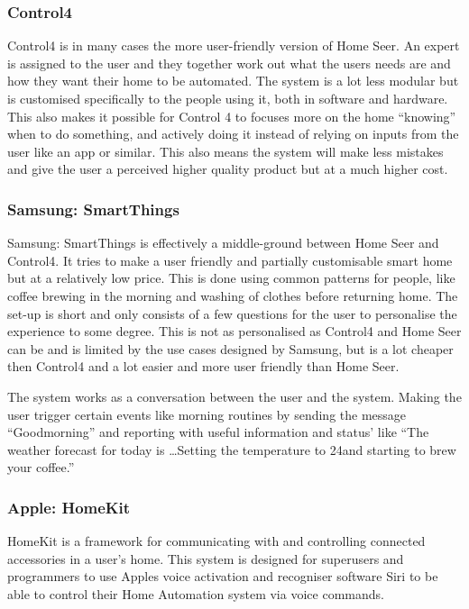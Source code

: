 \subsubsection{Control4}
Control4 is in many cases the more user-friendly version of Home Seer. An expert is assigned to the user and they together work out what the users needs are and how they want their home to be automated. The system is a lot less modular but is customised specifically to the people using it, both in software and hardware. This also makes it possible for Control 4 to focuses more on the home \enquote{knowing} when to do something, and actively doing it instead of relying on inputs from the user like an app or similar. This also means the system will make less mistakes and give the user a perceived higher quality product but at a much higher cost.%

\subsubsection{Samsung: SmartThings}
Samsung: SmartThings is effectively a middle-ground between Home Seer and Control4. It tries to make a user friendly and partially customisable smart home but at a relatively low price. This is done using common patterns for people, like coffee brewing in the morning and washing of clothes before returning home. The set-up is short and only consists of a few questions for the user to personalise the experience to some degree. This is not as personalised as Control4 and Home Seer can be and is limited by the use cases designed by Samsung, but is a lot cheaper then Control4 and a lot easier and more user friendly than Home Seer.

The system works as a conversation between the user and the system. Making the user trigger certain events like morning routines by sending the message \enquote{Goodmorning} and reporting with useful information and status' like \enquote{The weather forecast for today is \dots Setting the temperature to 24\degree and starting to brew your coffee.}

\subsubsection{Apple: HomeKit}
HomeKit is a framework for communicating with and controlling connected accessories in a user's home. %
This system is designed for superusers and programmers to use Apples voice activation and recogniser software Siri to be able to control their Home Automation system via voice commands.